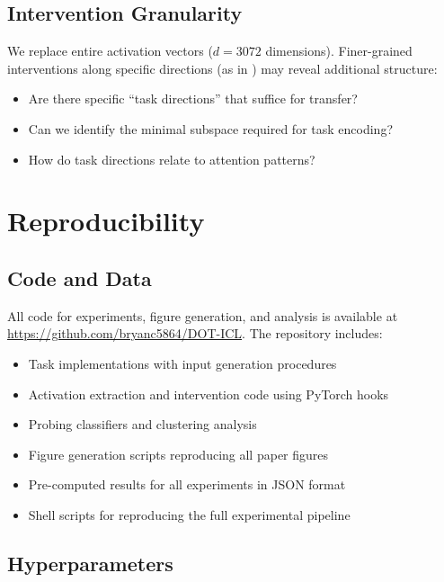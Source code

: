\documentclass{article}
\begin{document}
\subsection{Intervention Granularity}

We replace entire activation vectors ($d=3072$ dimensions). Finer-grained interventions along specific directions (as in \citealp{todd2023function}) may reveal additional structure:
\begin{itemize}
    \item Are there specific ``task directions'' that suffice for transfer?
    \item Can we identify the minimal subspace required for task encoding?
    \item How do task directions relate to attention patterns?
\end{itemize}

\section{Reproducibility}
\label{app:reproducibility}

\subsection{Code and Data}

All code for experiments, figure generation, and analysis is available at \url{https://github.com/bryanc5864/DOT-ICL}. The repository includes:
\begin{itemize}
    \item Task implementations with input generation procedures
    \item Activation extraction and intervention code using PyTorch hooks
    \item Probing classifiers and clustering analysis
    \item Figure generation scripts reproducing all paper figures
    \item Pre-computed results for all experiments in JSON format
    \item Shell scripts for reproducing the full experimental pipeline
\end{itemize}

\subsection{Hyperparameters}
\end{document}

